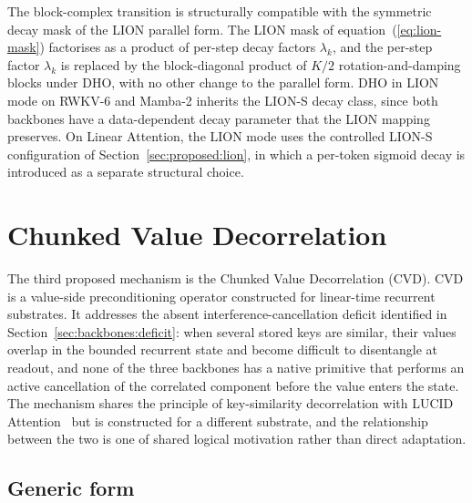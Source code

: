 The block-complex transition is structurally compatible with the
symmetric decay mask of the LION parallel form. The LION mask of
equation~(\ref{eq:lion-mask}) factorises as a product of per-step
decay factors $\lambda_{k}$, and the per-step factor $\lambda_{k}$
is replaced by the block-diagonal product of $K/2$
rotation-and-damping blocks under DHO, with no other change to the
parallel form. DHO in LION mode on RWKV-6 and Mamba-2 inherits
the LION-S decay class, since both backbones have a
data-dependent decay parameter that the LION mapping preserves.
On Linear Attention, the LION mode uses the controlled LION-S
configuration of Section~\ref{sec:proposed:lion}, in which a
per-token sigmoid decay is introduced as a separate structural
choice.

\section{Chunked Value Decorrelation}\label{sec:proposed:cvd}

The third proposed mechanism is the Chunked Value Decorrelation
(CVD). CVD is a value-side preconditioning operator constructed for
linear-time recurrent substrates. It addresses the absent
interference-cancellation deficit identified in
Section~\ref{sec:backbones:deficit}: when several stored keys are
similar, their values overlap in the bounded recurrent state and
become difficult to disentangle at readout, and none of the three
backbones has a native primitive that performs an active cancellation
of the correlated component before the value enters the state. The
mechanism shares the principle of key-similarity decorrelation with
LUCID Attention~\cite{duvvuri2026lucid} but is constructed for a
different substrate, and the relationship between the two is one of
shared logical motivation rather than direct adaptation.

\subsection{Generic form}

